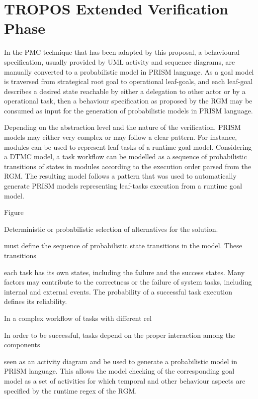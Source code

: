 \section{TROPOS Extended Verification Phase}

In the PMC technique that has been adapted by this proposal, a behavioural specification, usually provided by UML activity and sequence diagrams, are manually converted to a probabilistic model in PRISM language. As a goal model is traversed from strategical root goal to operational leaf-goals, and each leaf-goal describes a desired state reachable by either a delegation to other actor or by a operational task, then a behaviour specification as proposed by the RGM may be consumed as input for the generation of probabilistic models in PRISM language.



Depending on the abstraction level and the nature of the verification, PRISM models may either very complex or may follow a clear pattern. For instance, modules can be used to represent leaf-tasks of a runtime goal model. Considering a DTMC model, a task workflow can be modelled as a sequence of probabilistic transitions of states in modules according to the execution order parsed from the RGM. The resulting model follows a pattern that was used to automatically generate PRISM models representing leaf-tasks execution from a runtime goal model.


Figure~

Deterministic or probabilistic selection of alternatives for the solution.  


must define the sequence of probabilistic state transitions in the model. These transitions 


each task has its own states, including the failure and the success states. Many factors may contribute to the correctness or the failure of system tasks, including internal and external events. The probability of a successful task execution defines its reliability. 

In a complex workflow of tasks with different rel 


 In order to be successful, tasks depend on the proper interaction among the components 

seen as an activity diagram and be used to generate a probabilistic model in PRISM language. This allows the model checking of the corresponding goal model as a set of activities for which temporal and other behaviour aspects are specified by the runtime regex of the RGM.

